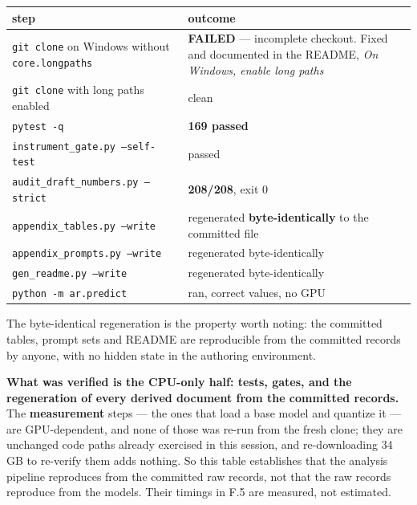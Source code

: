 \begin{table}[t]
\centering\scriptsize
\begin{tabularx}{\textwidth}{>{\hsize=0.623\hsize\raggedright\arraybackslash}X>{\hsize=1.377\hsize\raggedright\arraybackslash}X}
\toprule
step & outcome \\
\midrule
\texttt{git clone} on Windows without \texttt{core.\allowbreak{}longpaths} & \textbf{FAILED} --- incomplete checkout. Fixed and documented in the README, \emph{On Windows, enable long paths} \\
\texttt{git clone} with long paths enabled & clean \\
\texttt{pytest -\allowbreak{}q} & \textbf{169 passed} \\
\texttt{instrument\_\allowbreak{}gate.\allowbreak{}py --\allowbreak{}self-\allowbreak{}test} & passed \\
\texttt{audit\_\allowbreak{}draft\_\allowbreak{}numbers.\allowbreak{}py --\allowbreak{}strict} & \textbf{208/208}, exit 0 \\
\texttt{appendix\_\allowbreak{}tables.\allowbreak{}py --\allowbreak{}write} & regenerated \textbf{byte-identically} to the committed file \\
\texttt{appendix\_\allowbreak{}prompts.\allowbreak{}py --\allowbreak{}write} & regenerated byte-identically \\
\texttt{gen\_\allowbreak{}readme.\allowbreak{}py --\allowbreak{}write} & regenerated byte-identically \\
\texttt{python -\allowbreak{}m ar.\allowbreak{}predict} & ran, correct values, no GPU \\
\bottomrule
\end{tabularx}
\end{table}

The byte-identical regeneration is the property worth noting: the committed tables, prompt sets and README are reproducible from the committed records by anyone, with no hidden state in the authoring environment.

\textbf{What was verified is the CPU-only half: tests, gates, and the regeneration of every derived document from the committed records.} The \textbf{measurement} steps --- the ones that load a base model and quantize it --- are GPU-dependent, and none of those was re-run from the fresh clone; they are unchanged code paths already exercised in this session, and re-downloading 34 GB to re-verify them adds nothing. So this table establishes that the analysis pipeline reproduces from the committed raw records, not that the raw records reproduce from the models. Their timings in F.5 are measured, not estimated.


